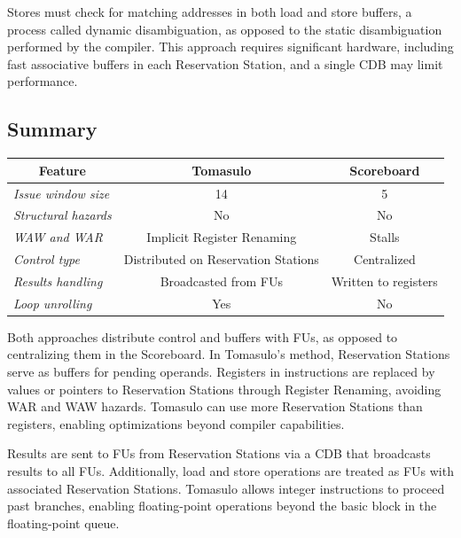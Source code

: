 Stores must check for matching addresses in both load and store buffers, a process called dynamic disambiguation, as opposed to the static disambiguation performed by the compiler. 
This approach requires significant hardware, including fast associative buffers in each Reservation Station, and a single CDB may limit performance.

\subsection{Summary}
\begin{table}[H]
    \centering
    \begin{tabular}{l|cc}
    \multicolumn{1}{c|}{\textbf{Feature}} & \textbf{Tomasulo}                   & \textbf{Scoreboard}  \\ \hline
    \textit{Issue window size}            & 14                                  & 5                    \\
    \textit{Structural hazards}           & No                                  & No                   \\
    \textit{WAW and WAR}                  & Implicit Register Renaming          & Stalls               \\
    \textit{Control type}                 & Distributed on Reservation Stations & Centralized          \\
    \textit{Results handling}             & Broadcasted from FUs                & Written to registers \\
    \textit{Loop unrolling}               & Yes                                 & No                  
    \end{tabular}
\end{table}
Both approaches distribute control and buffers with FUs, as opposed to centralizing them in the Scoreboard. 
In Tomasulo's method, Reservation Stations serve as buffers for pending operands. 
Registers in instructions are replaced by values or pointers to Reservation Stations through Register Renaming, avoiding WAR and WAW hazards. 
Tomasulo can use more Reservation Stations than registers, enabling optimizations beyond compiler capabilities.

Results are sent to FUs from Reservation Stations via a CDB that broadcasts results to all FUs. 
Additionally, load and store operations are treated as FUs with associated Reservation Stations. 
Tomasulo allows integer instructions to proceed past branches, enabling floating-point operations beyond the basic block in the floating-point queue.